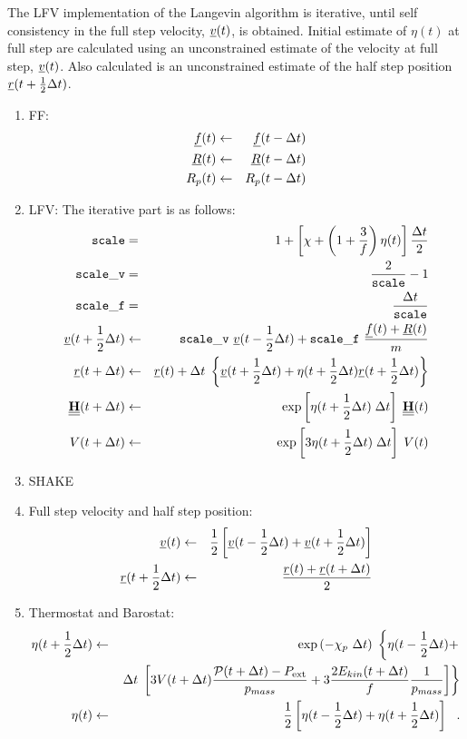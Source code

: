 The LFV implementation of the Langevin algorithm is iterative,
until self consistency in the full step velocity, $\mbox{$\underline{v}$}(t)$,
is obtained.  Initial estimate of $\eta (t)$ at
full step are calculated using an unconstrained estimate of the
velocity at full step, $\mbox{$\underline{v}$}(t)$.  Also calculated is an unconstrained
estimate of the half step position $\mbox{$\underline{r}$}(t + {1 \over 2} \Delta t)$.
\begin{enumerate}
\item FF:
\begin{eqnarray}
\mbox{$\underline{f}$}(t) &\leftarrow& \mbox{$\underline{f}$}(t - \Delta t) \nonumber \\
\mbox{$\underline{R}$}(t) &\leftarrow& \mbox{$\underline{R}$}(t - \Delta t) \\
R_{p} (t) &\leftarrow& R_{p} (t - \Delta t) \nonumber
\end{eqnarray}
\item LFV: The iterative part is as follows:
\begin{eqnarray}
{\tt scale} &=& 1 + \left[ \chi + \left(1+\frac{3}{f}\right) \eta (t) \right] \frac{\Delta t}{2} \nonumber \\
{\tt scale\_v} &=& \frac{2}{\tt scale}-1 \nonumber \\
{\tt scale\_f} &=& \frac{\Delta t}{\tt scale} \nonumber \\
\mbox{$\underline{v}$}(t + {1 \over 2} \Delta t) &\leftarrow&
{\tt scale\_v}~\mbox{$\underline{v}$}(t - {1 \over 2} \Delta t) +
{\tt scale\_f}~\frac{\mbox{$\underline{f}$}(t) + \mbox{$\underline{R}$}(t)}{m} \nonumber \\
\mbox{$\underline{r}$}(t + \Delta t) &\leftarrow& \mbox{$\underline{r}$}(t) + \Delta t \;
\left\{ \mbox{$\underline{v}$}(t + {1 \over 2} \Delta t) + \eta (t + {1 \over 2} \Delta t)
\mbox{$\underline{r}$}(t + {1 \over 2} \Delta t) \right\} \\
\mbox{$\underline{\underline{\bf H}}$}(t + \Delta t) &\leftarrow& \exp \left[ \eta (t + {1 \over 2} \Delta t) \;
\Delta t \right] \; \mbox{$\underline{\underline{\bf H}}$}(t) \nonumber \\
V(t + \Delta t) &\leftarrow& \exp \left[3 \eta (t + {1 \over 2} \Delta t) \;
\Delta t \right] \; V(t) \nonumber
\end{eqnarray}
\item SHAKE \item Full step velocity and half step position:
\begin{eqnarray}
\mbox{$\underline{v}$}(t) &\leftarrow& {1 \over 2} \left[ \mbox{$\underline{v}$}(t - {1 \over 2} \Delta t) +
\mbox{$\underline{v}$}(t + {1 \over 2} \Delta t) \right] \nonumber \\
\mbox{$\underline{r}$}(t + {1 \over 2} \Delta t) &\leftarrow& \frac{\mbox{$\underline{r}$}(t) + \mbox{$\underline{r}$}(t + \Delta t)}{2}
\end{eqnarray}
\item Thermostat and Barostat:
\begin{eqnarray}
\eta (t + {1 \over 2} \Delta t) &\leftarrow& \exp \left( -\chi_{p}~\Delta t \right) \;
\left\{ \eta (t - {1 \over 2} \Delta t) + \right. \nonumber \\
&& \left. \Delta t \; \left[ 3 V(t + \Delta t) \frac{{\cal P}(t + \Delta t) - P_{\rm ext}}{p_{mass}} +
3 \frac{2 E_{kin}(t + \Delta t)}{f} \frac{1}{p_{mass}} \right] \right\} \\
\eta (t) &\leftarrow& {1 \over 2} \left[ \eta (t - {1 \over 2} \Delta t) +
\eta (t + {1 \over 2} \Delta t) \right]~~. \nonumber
\end{eqnarray}
\end{enumerate}
